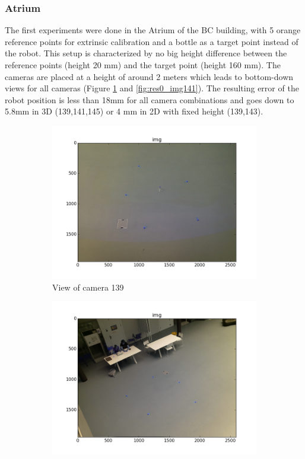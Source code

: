 \subsubsection{Atrium}
The first experiments were done in the Atrium of the BC building, with 5 orange reference points for extrinsic calibration and a bottle as a target point instead of the robot.
This setup is characterized by no big height difference between the reference points (height 20 mm) and the target point (height 160 mm). 
The cameras are placed at a height of around 2 meters which leads to bottom-down views for all cameras (Figure \ref{fig:res0_img139} and \ref{fig:res0_img141}).
The resulting error of the robot position is less than 18mm for all camera combinations and goes down to 5.8mm in 3D (139,141,145) or 4 mm in 2D with fixed height (139,143). 
\begin{figure}[H]
    \centering
    \begin{subfigure}{0.4\linewidth}
        \includegraphics[width=\linewidth]{files/res0_img139.png}
        \caption{View of camera 139 }
        \label{fig:res0_img139}
    \end{subfigure}
    \begin{subfigure}{0.4\linewidth}
        \includegraphics[width=\linewidth]{files/res0_img141.png}

\end{subfigure}
\end{figure}
